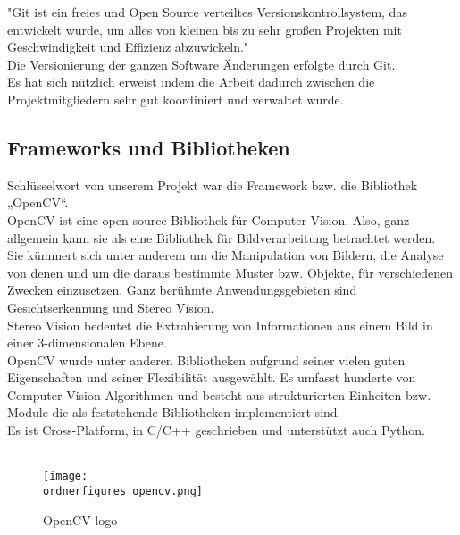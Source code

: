 "Git ist ein freies und Open Source verteiltes Versionskontrollsystem, das entwickelt wurde, um alles von kleinen bis zu sehr großen Projekten mit Geschwindigkeit und Effizienz abzuwickeln." \cite{Git1} \\
Die Versionierung der ganzen Software Änderungen erfolgte durch Git.\\
Es hat sich nützlich erweist indem die Arbeit dadurch zwischen die Projektmitgliedern sehr gut koordiniert und verwaltet wurde. \\ 


\subsection{Frameworks und Bibliotheken}

Schlüsselwort von unserem Projekt war die Framework bzw. die Bibliothek „OpenCV“.\\
OpenCV ist eine open-source Bibliothek für Computer Vision. Also, ganz allgemein kann sie als eine Bibliothek für Bildverarbeitung betrachtet werden.\\
Sie kümmert sich unter anderem um die Manipulation von Bildern, die Analyse von denen und um die daraus bestimmte Muster bzw. Objekte, für verschiedenen Zwecken einzusetzen. Ganz berühmte Anwendungsgebieten sind Gesichtserkennung und Stereo Vision. \\
Stereo Vision bedeutet die Extrahierung von Informationen aus einem Bild in einer 3-dimensionalen Ebene. \\
OpenCV wurde unter anderen Bibliotheken aufgrund seiner vielen guten Eigenschaften und seiner Flexibilität ausgewählt. Es umfasst hunderte von Computer-Vision-Algorithmen und besteht aus strukturierten Einheiten bzw. Module die als feststehende Bibliotheken implementiert sind. \\
Es ist Cross-Platform, in C/C++ geschrieben und unterstützt auch Python. \\
\cite{opencv_library}
\\
\begin{figure}[H]
	\texttt{[image: \\ordnerfigures opencv.png]}
	\caption{OpenCV logo}
	\label{fig:OpenCV logo} 
	\cite{OpencvLogo}
\end{figure}


